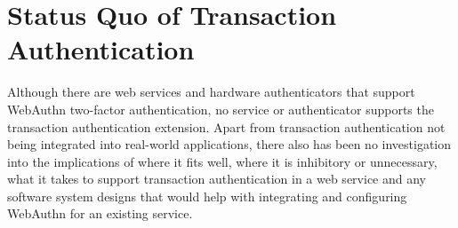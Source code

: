



\section{Status Quo of Transaction Authentication}\label{Sec:StatusQuo}


Although there are web services and hardware authenticators that support WebAuthn two-factor authentication, no service or authenticator supports the transaction authentication extension. Apart from transaction authentication not being integrated into real-world applications, there also has been no investigation into the implications of where it fits well, where it is inhibitory or unnecessary, what it takes to support transaction authentication in a web service and any software system designs that would help with integrating and configuring WebAuthn for an existing service.


